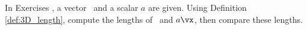 {\noin In Exercises}
{, a vector \vx\ and a scalar $a$ are given. Using Definition \ref{def:3D_length}, compute the lengths of \vx\ and $a\vx$, then compare these lengths.}
